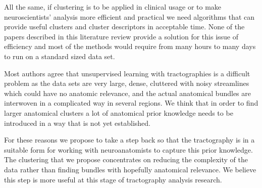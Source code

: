 \documentclass{bioinfo}
\begin{document}
All the same, if clustering is to be applied in clinical usage or to
make neuroscientists' analysis more efficient and practical we need
algorithms that can provide useful clusters and cluster descriptors in
acceptable time. None of the papers described in this literature review
provide a solution for this issue of efficiency and most of the methods
would require from many hours to many days to run on a standard sized
data set.


Most authors agree that unsupervised learning with tractographies is a
difficult problem as the data sets are very large, dense, cluttered with
noisy streamlines which could have no anatomic relevance, and the actual
anatomical bundles are interwoven in a complicated way in several
regions. 
We think that in order to find larger anatomical clusters a lot of
anatomical prior knowledge needs to be introduced in a way that is not
yet established.  

For these reasons we propose to take a step back so that the
tractography is in a suitable form for working with neuroanatomists to
capture this prior knowledge. The clustering that we propose
concentrates on reducing the complexity of the data rather than finding
bundles with hopefully anatomical relevance. We believe this step is
more useful at this stage of tractography analysis research.
\end{document}
